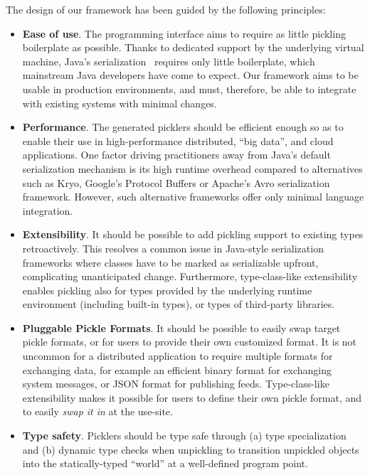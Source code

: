 \documentclass[10pt]{sigplanconf}
\theoremstyle{definition}
\theoremstyle{definition}
\begin{document}
The design of our framework has been guided by the following principles:
\vspace{-0.3cm}
\begin{itemize}
\item {\bf Ease of use}. The programming interface aims to require as little
pickling boilerplate as possible. Thanks to dedicated support by the
underlying virtual machine, Java's serialization~\cite{JavaSerialization}
requires only little boilerplate, which mainstream Java developers have come
to expect. Our framework aims to be usable in production environments, and
must, therefore, be able to integrate with existing systems with minimal
changes.

\item {\bf Performance}. The generated picklers should be efficient enough  so
as to enable their use in high-performance distributed, ``big data'', and
cloud applications. One factor driving practitioners away from Java's default
serialization mechanism is its high runtime overhead compared to alternatives
such as Kryo, Google's Protocol Buffers or Apache's Avro serialization
framework. However, such alternative frameworks offer only minimal language
integration.

\item {\bf Extensibility}. It should be possible to add pickling support to existing
types retroactively. This resolves a common issue in Java-style serialization
frameworks where classes have to be marked as serializable upfront,
complicating unanticipated change. Furthermore, type-class-like extensibility
enables pickling also for types provided by the underlying runtime environment
(including built-in types), or types of third-party libraries.

\item {\bf Pluggable Pickle Formats}. It should be possible to easily swap target
pickle formats, or for users to provide their own customized format. It is not
uncommon for a distributed application to require multiple formats for
exchanging data, for example an efficient binary format for exchanging system
messages, or JSON format for publishing feeds. Type-class-like extensibility
makes it possible for users to define their own pickle format, and to easily
{\em swap it in} at the use-site.

\item {\bf Type safety}. Picklers should be type safe through (a) type
specialization and (b) dynamic type checks when unpickling to transition
unpickled objects into the statically-typed ``world'' at a well-defined program
point.


\end{itemize}
\end{document}
